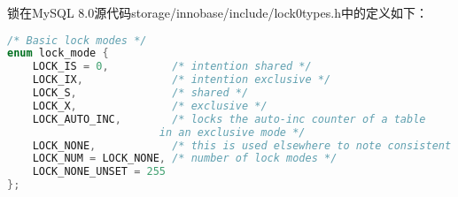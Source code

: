\documentclass[../../../interview-questions.tex]{subfiles}
\begin{document}
锁在MySQL 8.0源代码storage/innobase/include/lock0types.h中的定义如下：

\begin{lstlisting}[language=C]
/* Basic lock modes */
enum lock_mode {
    LOCK_IS = 0,          /* intention shared */
    LOCK_IX,              /* intention exclusive */
    LOCK_S,               /* shared */
    LOCK_X,               /* exclusive */
    LOCK_AUTO_INC,        /* locks the auto-inc counter of a table
                        in an exclusive mode */
    LOCK_NONE,            /* this is used elsewhere to note consistent read */
    LOCK_NUM = LOCK_NONE, /* number of lock modes */
    LOCK_NONE_UNSET = 255
};
\end{lstlisting}
\end{document}
